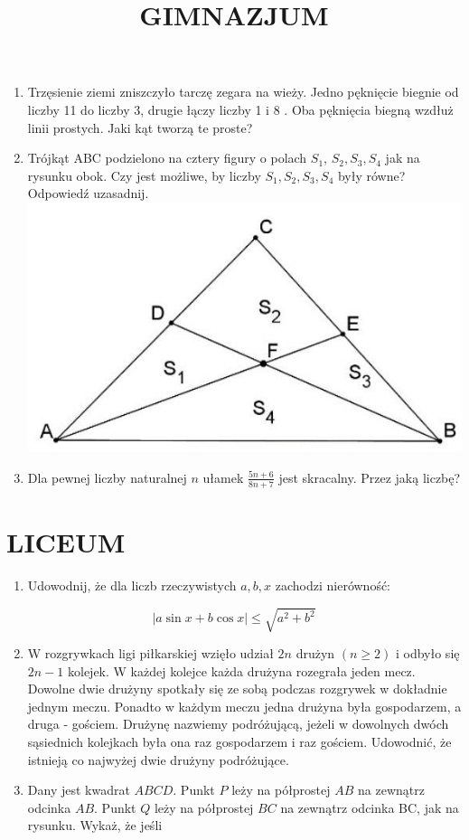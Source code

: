 \documentclass[10pt]{article}
\title{GIMNAZJUM }
\author{}
\date{}
\begin{document}
\maketitle
\begin{enumerate}
  \item Trzęsienie ziemi zniszczyło tarczę zegara na wieży. Jedno pęknięcie biegnie od liczby 11 do liczby 3, drugie łączy liczby 1 i 8 . Oba pęknięcia biegną wzdłuż linii prostych. Jaki kąt tworzą te proste?
  \item Trójkąt ABC podzielono na cztery figury o polach \(S_{1}\), \(S_{2}, S_{3}, S_{4}\) jak na rysunku obok. Czy jest możliwe, by liczby \(S_{1}, S_{2}, S_{3}, S_{4}\) były równe? Odpowiedź uzasadnij.\\
\includegraphics[max width=\textwidth, center]{2024_11_21_15d8c8dfe5a0f4f689ffg-1}
  \item Dla pewnej liczby naturalnej \(n\) ułamek \(\frac{5 n+6}{8 n+7}\) jest skracalny. Przez jaką liczbę?
\end{enumerate}

\section*{LICEUM}
\begin{enumerate}
  \item Udowodnij, że dla liczb rzeczywistych \(a, b, x\) zachodzi nierówność:
\end{enumerate}

\[
|a \sin x+b \cos x| \leq \sqrt{a^{2}+b^{2}}
\]

\begin{enumerate}
  \setcounter{enumi}{1}
  \item W rozgrywkach ligi piłkarskiej wzięło udział \(2 n\) drużyn \((n \geq 2)\) i odbyło się \(2 n-1\) kolejek. W każdej kolejce każda drużyna rozegrała jeden mecz. Dowolne dwie drużyny spotkały się ze sobą podczas rozgrywek w dokładnie jednym meczu. Ponadto w każdym meczu jedna drużyna była gospodarzem, a druga - gościem. Drużynę nazwiemy podróżującą, jeżeli w dowolnych dwóch sąsiednich kolejkach była ona raz gospodarzem i raz gościem. Udowodnić, że istnieją co najwyżej dwie drużyny podróżujące.
  \item Dany jest kwadrat \(A B C D\). Punkt \(P\) leży na półprostej \(A B\) na zewnątrz odcinka \(A B\). Punkt \(Q\) leży na półprostej \(B C\) na zewnątrz odcinka BC, jak na rysunku. Wykaż, że jeśli
\end{enumerate}
\end{document}
